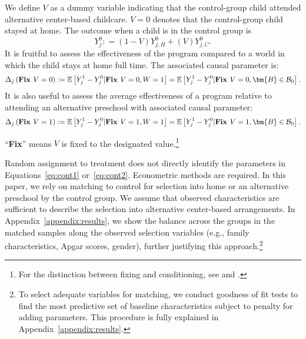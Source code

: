 We define $V$ as a dummy variable indicating that the control-group child attended alternative center-based childcare. $V=0$ denotes that the control-group child stayed at home. The outcome when a child is in the control group is
\begin{equation}
Y_{j}^0 : = \left( 1 - V \right) Y_{j,H}^0 + \left( V \right) Y_{j,C}^0. \label{eq:meandiff}
\end{equation}
\noindent It is fruitful to assess the effectiveness of the program compared to a world in which the child stays at home full time. The associated causal parameter is:
\begin{equation}\label{eq:cont1}
\Delta_j \left(\text{\textbf{Fix }}V = 0 \right) : =   \mathbb{E} \left[ Y_{j}^1 -  Y_{j}^0 | \text{\textbf{Fix }}V = 0, W = 1 \right] = \mathbb{E} \left[Y_{j}^1 -  Y_{j}^0 | \text{\textbf{Fix }}V = 0, \bm{B} \in \mathcal{B}_0 \right].
\end{equation}
It is also useful to assess the average effectiveness of a program relative to attending an alternative preschool with associated causal parameter:
\begin{equation}\label{eq:cont2}
\Delta_j \left( \text{\textbf{Fix }} V =1 \right) : =   \mathbb{E} \left[ Y_{j}^1 -  Y_{j}^0 | \text{\textbf{Fix }} V = 1, W = 1 \right] = \mathbb{E} \left[ Y_{j}^1 -  Y_{j}^0 | \text{\textbf{Fix }} V = 1, \bm{B} \in \mathcal{B}_0 \right].
\end{equation}

\noindent ``\textbf{Fix}'' means $V$ is fixed to the designated value.\footnote{For the distinction between fixing and conditioning, see \citet{Haavelmo_1943_Econometrica} and \citet{Heckman_Pinto_2015_EconometTheory}.}

Random assignment to treatment does not directly identify the parameters in Equations~\eqref{eq:cont1} or~\eqref{eq:cont2}. Econometric methods are required. In this paper, we rely on matching to control for selection into home or an alternative preschool by the control group. We assume that observed characteristics are sufficient to describe the selection into alternative center-based arrangements. In Appendix~\ref{appendix:results}, we show the balance across the groups in the matched samples along the observed selection variables (e.g., family characteristics, Apgar scores, gender), further justifying this approach.\footnote{To select adequate variables for matching, we conduct goodness of fit tests to find the most predictive set of baseline characteristics subject to penalty for adding parameters. This procedure is fully explained in Appendix~\ref{appendix:results}.}

